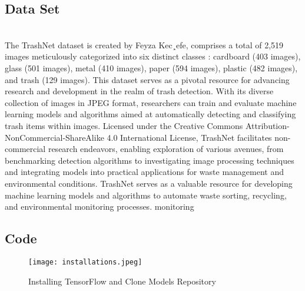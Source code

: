 \documentclass[12pt, English]{article}
\begin{document}
\subsection{Data Set}\\
The TrashNet dataset is created by Feyza Kec¸efe, comprises
a total of 2,519 images meticulously categorized into six
distinct classes : cardboard (403 images), glass (501 images),
metal (410 images), paper (594 images), plastic (482 images),
and trash (129 images). This dataset serves as a pivotal resource for advancing research and development in the realm of trash detection. With its diverse collection of images in JPEG format, researchers can train and evaluate machine learning models and algorithms aimed at automatically detecting and classifying trash items within images. Licensed under the Creative Commons Attribution-NonCommercial-ShareAlike 4.0 International License, TrashNet facilitates non-commercial research endeavors, enabling exploration of various avenues, from benchmarking detection algorithms to investigating image processing techniques and integrating models into practical applications for waste management and environmental conditions.  TrashNet serves as a valuable resource for developing machine learning models and algorithms to automate waste sorting, recycling, and environmental monitoring processes.
monitoring\\

\subsection{Code}
\begin{normalsize}
\begin{figure}[htb]
\begin{center}
\texttt{[image: installations.jpeg]}
\end{center}
\begin{center}
\renewcommand{\thefigure}{5.2.1}
\caption{\footnotesize Installing TensorFlow and Clone Models Repository}
\end{center}
\end{figure}
\end{normalsize}
\end{document}
